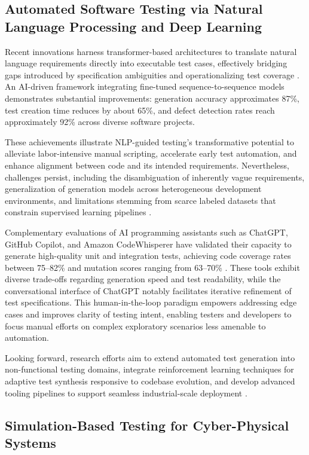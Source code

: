 \documentclass[sigconf]{acmart}
\begin{document}
\subsection{Automated Software Testing via Natural Language Processing and Deep Learning}

Recent innovations harness transformer-based architectures to translate natural language requirements directly into executable test cases, effectively bridging gaps introduced by specification ambiguities and operationalizing test coverage \cite{ref30}. An AI-driven framework integrating fine-tuned sequence-to-sequence models demonstrates substantial improvements: generation accuracy approximates 87\%, test creation time reduces by about 65\%, and defect detection rates reach approximately 92\% across diverse software projects.

These achievements illustrate NLP-guided testing's transformative potential to alleviate labor-intensive manual scripting, accelerate early test automation, and enhance alignment between code and its intended requirements. Nevertheless, challenges persist, including the disambiguation of inherently vague requirements, generalization of generation models across heterogeneous development environments, and limitations stemming from scarce labeled datasets that constrain supervised learning pipelines \cite{ref30}.

Complementary evaluations of AI programming assistants such as ChatGPT, GitHub Copilot, and Amazon CodeWhisperer have validated their capacity to generate high-quality unit and integration tests, achieving code coverage rates between 75--82\% and mutation scores ranging from 63--70\% \cite{ref32}. These tools exhibit diverse trade-offs regarding generation speed and test readability, while the conversational interface of ChatGPT notably facilitates iterative refinement of test specifications. This human-in-the-loop paradigm empowers addressing edge cases and improves clarity of testing intent, enabling testers and developers to focus manual efforts on complex exploratory scenarios less amenable to automation.

Looking forward, research efforts aim to extend automated test generation into non-functional testing domains, integrate reinforcement learning techniques for adaptive test synthesis responsive to codebase evolution, and develop advanced tooling pipelines to support seamless industrial-scale deployment \cite{ref30}.

\subsection{Simulation-Based Testing for Cyber-Physical Systems}
\end{document}
